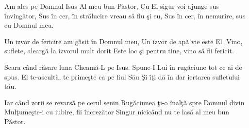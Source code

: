 
\beginverse
Am ales pe Domnul Isus
Al meu bun Păstor,
Cu El sigur voi ajunge sus învingător,
Sus în cer, în strălucire vreau să fiu şi eu,
Sus în cer, în nemurire, sus cu Domnul meu.
\endverse

\beginchorus
Un izvor de fericire am găsit în Domnul meu,
Un izvor de apă vie este El.
Vino, suflete, aleargă la izvorul mult dorit
Este loc şi pentru tine, vino să fii fericit.
\endchorus

\beginverse
Seara când răsare luna
Cheamă-L pe Isus.
Spune-I Lui în rugăciune tot ce ai de spus.
El te-ascultă, te primeşte ca pe fiul Său
Şi îţi dă în dar iertarea sufletului tău.
\endverse

\beginverse
Iar când zorii se revarsă pe cerul senin
Rugăciunea ţi-o înalţă spre Domnul divin
Mulţumeşte-i cu iubire, fii încrezător
Singur nicicând nu te lasă al meu bun Păstor.
\endverse

\endsong